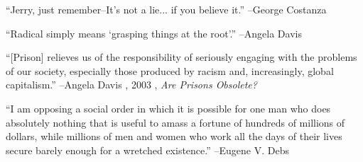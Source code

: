 \documentclass{article}%
\begin{document}
\linebreak%
\vspace{1mm}%
\begin{minipage}{\textwidth}%
\flushleft%
“Jerry, just remember–It's not a lie... if you believe it.”%
\linebreak%
\vspace{1mm}%
–George Costanza%
\linebreak%
\vspace{1mm}%
\end{minipage}%
\linebreak%
\vspace{1mm}%
\begin{minipage}{\textwidth}%
\flushleft%
“Radical simply means ‘grasping things at the root’.”%
\linebreak%
\vspace{1mm}%
–Angela Davis%
\linebreak%
\vspace{1mm}%
\end{minipage}%
\linebreak%
\vspace{1mm}%
\begin{minipage}{\textwidth}%
\flushleft%
“{[}Prison{]} relieves us of the responsibility of seriously engaging with the problems of  our society, especially those produced by racism and, increasingly, global capitalism.”%
\linebreak%
\vspace{1mm}%
–Angela Davis%
, 2003%
, \textit{Are Prisons Obsolete?}%
\linebreak%
\vspace{1mm}%
\end{minipage}%
\linebreak%
\vspace{1mm}%
\begin{minipage}{\textwidth}%
\flushleft%
“I am opposing a social order in which it is possible for one man who does absolutely nothing that is useful to amass a fortune of hundreds of millions of dollars, while millions of men and women who work all the days of their lives secure barely enough for a wretched existence.”%
\linebreak%
\vspace{1mm}%
–Eugene V. Debs%
\linebreak%
\vspace{1mm}%
\end{minipage}%
\linebreak%
\vspace{1mm}%
\end{document}
